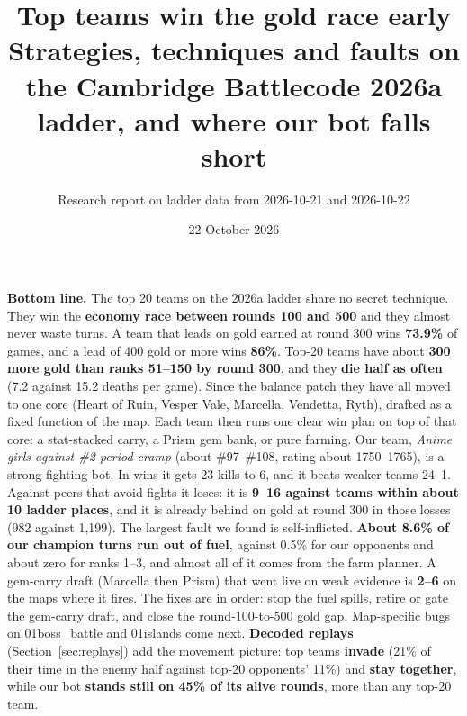 \documentclass[11pt,a4paper]{article}
\title{\vspace{-1.2cm}\textbf{Top teams win the gold race early}\\[0.3em]
\large Strategies, techniques and faults on the Cambridge Battlecode 2026a ladder, and where our bot falls short}
\author{Research report on ladder data from 2026-10-21 and 2026-10-22}
\date{22 October 2026}
\begin{document}
\maketitle

\noindent\colorbox{cSoft}{\parbox{\dimexpr\linewidth-2\fboxsep}{\small
\textbf{Bottom line.} The top 20 teams on the 2026a ladder share no secret technique. They win the \textbf{economy race between rounds 100 and 500} and they almost never waste turns. A team that leads on gold earned at round 300 wins \textbf{73.9\%} of games, and a lead of 400 gold or more wins \textbf{86\%}. Top-20 teams have about \textbf{300 more gold than ranks 51--150 by round 300}, and they \textbf{die half as often} (7.2 against 15.2 deaths per game). Since the balance patch they have all moved to one core (Heart of Ruin, Vesper Vale, Marcella, Vendetta, Ryth), drafted as a fixed function of the map. Each team then runs one clear win plan on top of that core: a stat-stacked carry, a Prism gem bank, or pure farming. Our team, \emph{Anime girls against \#2 period cramp} (about \#97--\#108, rating about 1750--1765), is a strong fighting bot. In wins it gets 23 kills to 6, and it beats weaker teams 24--1. Against peers that avoid fights it loses: it is \textbf{9--16 against teams within about 10 ladder places}, and it is already behind on gold at round 300 in those losses (982 against 1,199). The largest fault we found is self-inflicted. \textbf{About 8.6\% of our champion turns run out of fuel}, against 0.5\% for our opponents and about zero for ranks 1--3, and almost all of it comes from the farm planner. A gem-carry draft (Marcella then Prism) that went live on weak evidence is \textbf{2--6} on the maps where it fires. The fixes are in order: stop the fuel spills, retire or gate the gem-carry draft, and close the round-100-to-500 gold gap. Map-specific bugs on 01boss\_battle and 01islands come next. \textbf{Decoded replays} (Section~\ref{sec:replays}) add the movement picture: top teams \textbf{invade} (21\% of their time in the enemy half against top-20 opponents' 11\%) and \textbf{stay together}, while our bot \textbf{stands still on 45\% of its alive rounds}, more than any top-20 team.}}
\end{document}
